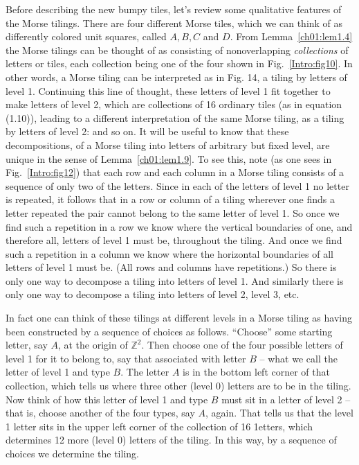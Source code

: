 \documentclass[reqno]{stml-l}
\theoremstyle{plain}
\theoremstyle{definition}
\numberwithin{equation}{chapter}
\begin{document}
Before describing the new bumpy tiles, let's review some qualitative features of the Morse tilings. There are four different Morse tiles, which we can think of as differently colored unit squares, called $A,B,C$ and $D$. From Lemma~\ref{ch01:lem1.4} the Morse tilings can be thought of as consisting of nonoverlapping \emph{collections} of letters or tiles, each collection being one of the four shown in Fig.~\ref{Intro:fig10}. In other words, a
Morse tiling can be interpreted as in Fig. 14, a tiling by letters of level 1. Continuing this line of thought, these letters of level 1 fit together to make letters of level 2, which are collections of 16 ordinary tiles (as in equation (1.10)), leading to a different interpretation of the same Morse tiling, as a tiling by letters of level 2: and so on. It will be useful to know that these decompositions, of a Morse tiling into letters of arbitrary but fixed level, are unique in the sense of Lemma~\ref{ch01:lem1.9}. To see this, note (as one sees in Fig.~\ref{Intro:fig12}) that each row and each column in a Morse tiling consists of a sequence of only two of the letters. Since in each of the letters of level 1 no letter is repeated, it follows that in a row or column of a tiling wherever one finds a letter repeated the pair cannot belong to the same letter of level 1. So once we find such a repetition in a row we know where the vertical boundaries of one, and therefore all, letters of level 1 must be, throughout the tiling. And once we find such a repetition in a column we know where the horizontal boundaries of all letters of level 1 must be. (All rows and columns have repetitions.) So there is only one way to decompose a tiling into letters of level 1. And similarly there is only one way to decompose a tiling into letters of level 2, level 3, etc.

In fact one can think of these tilings at different levels in a Morse tiling as having been constructed by a sequence of choices as follows. ``Choose'' some starting letter, say $A$, at the origin of $\mathbb{Z}^{2}$. Then choose one of the four possible letters of level 1 for it to belong to, say that associated with letter $B$ -- what we call the letter of level 1 and type $B$. The letter $A$ is in the bottom left corner of that collection, which tells us where three other (level 0) letters are to be in the tiling. Now think of how this letter of level 1 and type $B$ must sit in a letter of level 2 -- that is, choose another of the four types, say $A$, again. That tells us that the level 1 letter sits in the upper left corner of the collection of 16 1etters, which determines 12 more (level 0) letters of the tiling. In this way, by a sequence of choices we determine the tiling.
\end{document}
